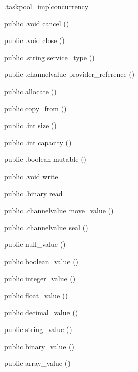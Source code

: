 \begin{CrexxClass}{.taskpool\_impl}{concurrency}
\begin{Members}
    \Method
      {public}
      {.void}
      {cancel}
      {()}

    \Method
      {public}
      {.void}
      {close}
      {()}

    \Method
      {public}
      {.string}
      {service\_type}
      {()}

    \Method
      {public}
      {.channelvalue}
      {provider\_reference}
      {()}

    \Factory
      {public}
      {allocate}
      {()}

    \Factory
      {public}
      {copy\_from}
      {()}

    \Method
      {public}
      {.int}
      {size}
      {()}

    \Method
      {public}
      {.int}
      {capacity}
      {()}

    \Method
      {public}
      {.boolean}
      {mutable}
      {()}

    \Method
      {public}
      {.void}
      {write}
      {}

    \Method
      {public}
      {.binary}
      {read}
      {}

    \Method
      {public}
      {.channelvalue}
      {move\_value}
      {()}

    \Method
      {public}
      {.channelvalue}
      {seal}
      {()}

    \Factory
      {public}
      {null\_value}
      {()}

    \Factory
      {public}
      {boolean\_value}
      {()}

    \Factory
      {public}
      {integer\_value}
      {()}

    \Factory
      {public}
      {float\_value}
      {()}

    \Factory
      {public}
      {decimal\_value}
      {()}

    \Factory
      {public}
      {string\_value}
      {()}

    \Factory
      {public}
      {binary\_value}
      {()}

    \Factory
      {public}
      {array\_value}
      {()}


\end{Members}
\end{CrexxClass}
